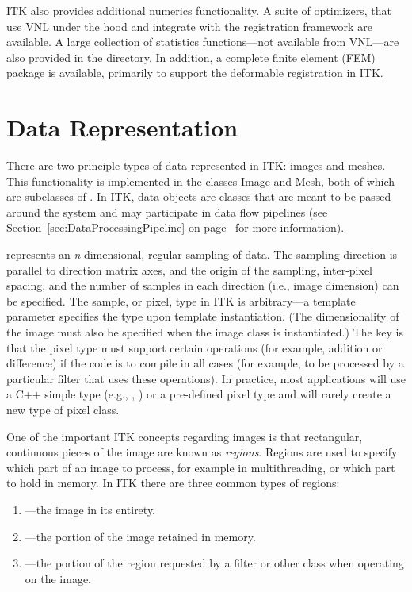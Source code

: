 ITK also provides additional numerics functionality. A suite of optimizers, that
use VNL under the hood and integrate with the registration framework
are available. A large collection of statistics functions---not available from
VNL---are also provided in the 
directory. In addition, a complete finite element (FEM) package is available,
primarily to support the deformable registration in ITK.


\section{Data Representation}
\label{sec:DataRepresentationAndAccess}


There are two principle types of data represented in ITK: images and
meshes. This functionality is implemented in the classes
Image and Mesh, both of which are subclasses of
. In ITK, data objects are classes that are meant to
be passed around the system and may participate in data flow pipelines (see
Section~\ref{sec:DataProcessingPipeline} on
page~\pageref{sec:DataProcessingPipeline} for more information).



 represents an \emph{n}-dimensional, regular sampling of
data. The sampling direction is parallel to direction matrix axes, and
the origin of the sampling, inter-pixel spacing, and the number of samples in
each direction (i.e., image dimension) can be specified. The sample, or
pixel, type in ITK is arbitrary---a template parameter 
specifies the type upon template instantiation. (The dimensionality of the
image must also be specified when the image class is instantiated.) The key
is that the pixel type must support certain operations (for example, addition
or difference) if the code is to compile in all cases (for example, to be
processed by a particular filter that uses these operations). In practice,
most applications will use a C++ simple type (e.g., , )
or a pre-defined pixel type and will rarely create a new type of pixel class.

One of the important ITK concepts regarding images is that rectangular,
continuous pieces of the image are known as \emph{regions}. Regions are used
to specify which part of an image to process, for example in multithreading,
or which part to hold in memory. In ITK there are three common types of
regions:
\begin{enumerate}
\item {}---the image in its entirety.
\item {}---the portion of the image retained in memory.
\item {}---the portion of the region requested by a
filter or other class when operating on the image.
\end{enumerate}

